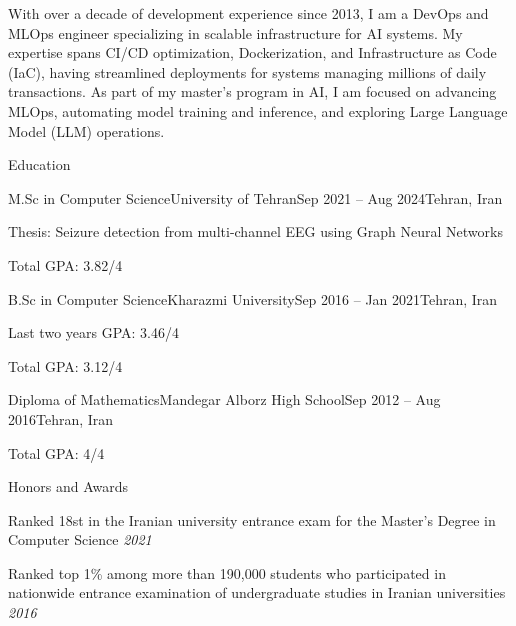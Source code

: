 \documentclass[]{main}
\begin{document}
\resumeheader
{}
{}
{}
{}
{}
{}

With over a decade of development experience since 2013, I am a DevOps and MLOps engineer specializing in scalable infrastructure for AI systems. My expertise spans CI/CD optimization, Dockerization, and Infrastructure as Code (IaC), having streamlined deployments for systems managing millions of daily transactions. As part of my master's program in AI, I am focused on advancing MLOps, automating model training and inference, and exploring Large Language Model (LLM) operations.

\begin{section}{Education}
 \begin{subsectionnobullet}{M.Sc in Computer Science}{University of Tehran}{Sep 2021 -- Aug 2024}{Tehran, Iran}
     \item Thesis: Seizure detection from multi-channel EEG using Graph Neural Networks
     \item Total GPA: 3.82/4
 \end{subsectionnobullet}
 \begin{subsectionnobullet}{B.Sc in Computer Science}{Kharazmi University}{Sep 2016 -- Jan 2021}{Tehran, Iran}
     \item Last two years GPA: 3.46/4
     \item Total GPA: 3.12/4
 \end{subsectionnobullet}
 \begin{subsectionnobullet}{Diploma of Mathematics}{Mandegar Alborz High School}{Sep 2012 -- Aug 2016}{Tehran, Iran}
     \item Total GPA: 4/4
 \end{subsectionnobullet}
\end{section}

\begin{section}{Honors and Awards}
 \begin{subsectionbullet}
     \item Ranked 18st in the Iranian university entrance exam for the Master's Degree in Computer Science \hfill \textit{2021}
     \item Ranked top 1\% among more than 190,000 students who participated in nationwide entrance examination of undergraduate studies in Iranian universities \hfill \textit{2016}
 \end{subsectionbullet}
\end{section}
\end{document}
